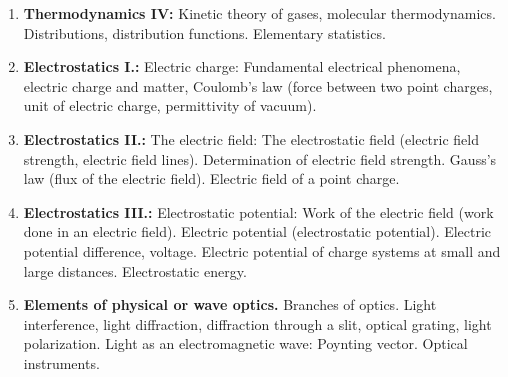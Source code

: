 \documentclass[t,aspectratio=169]{beamer}
\begin{document}
\begin{frame}
\begin{enumerate}
\item \textbf{Thermodynamics IV:} Kinetic theory of gases, molecular thermodynamics. Distributions, distribution functions. Elementary statistics.
\item \textbf{Electrostatics I.:} Electric charge: Fundamental electrical phenomena, electric charge and matter, Coulomb’s law (force between two point charges, unit of electric charge, permittivity of vacuum).
\item \textbf{Electrostatics II.:} The electric field: The electrostatic field (electric field strength, electric field lines). Determination of electric field strength. Gauss’s law (flux of the electric field). Electric field of a point charge.
\pagebreak
\item \textbf{Electrostatics III.:} Electrostatic potential: Work of the electric field (work done in an electric field). Electric potential (electrostatic potential). Electric potential difference, voltage. Electric potential of charge systems at small and large distances. Electrostatic energy.
\item \textbf{Elements of physical or wave optics.} Branches of optics. Light interference, light diffraction, diffraction through a slit, optical grating, light polarization. Light as an electromagnetic wave: Poynting vector. Optical instruments.
\end{enumerate}
\end{frame}

\end{document}
